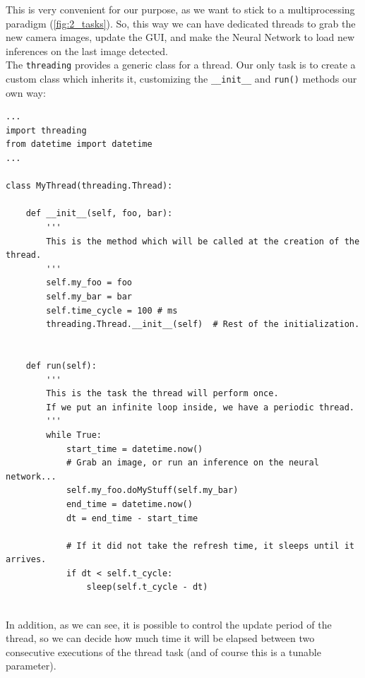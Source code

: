 	This is very convenient for our purpose, as we want to stick to a multiprocessing paradigm (\autoref{fig:2_tasks}). So, this way we can have dedicated threads to grab the new camera images, update the GUI, and make the Neural Network to load new inferences on the last image detected.\\
	
	The \texttt{threading} provides a generic class for a thread. Our only task is to create a custom class which inherits it, customizing the \texttt{\_\_init\_\_} and \texttt{run()} methods our own way:
	

	\begin{lstlisting}
...
import threading
from datetime import datetime
...

class MyThread(threading.Thread):

	def __init__(self, foo, bar):
		'''
		This is the method which will be called at the creation of the thread.
		'''
		self.my_foo = foo
		self.my_bar = bar
		self.time_cycle = 100 # ms
		threading.Thread.__init__(self)  # Rest of the initialization.
		
		
	def run(self):
		'''
		This is the task the thread will perform once.
		If we put an infinite loop inside, we have a periodic thread.
		'''
		while True:
			start_time = datetime.now()
			# Grab an image, or run an inference on the neural network...
			self.my_foo.doMyStuff(self.my_bar)
			end_time = datetime.now()
			dt = end_time - start_time
			
			# If it did not take the refresh time, it sleeps until it arrives.
			if dt < self.t_cycle:
				sleep(self.t_cycle - dt)
				
	\end{lstlisting}
	
In addition, as we can see, it is possible to control the update period of the thread, so we can decide how much time it will be elapsed between two consecutive executions of the thread task (and of course this is a tunable parameter).\\
